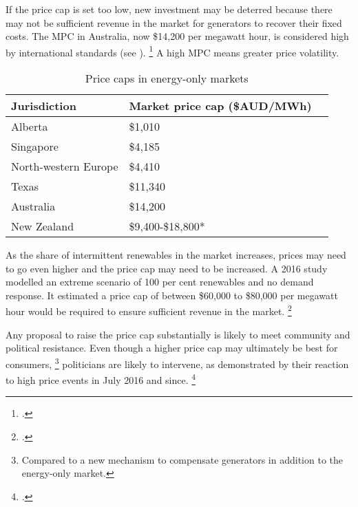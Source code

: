 \documentclass[FrontPage]{grattan}
\begin{document}
If the price cap is set too low, new investment may be deterred because there may not be sufficient revenue in the market for generators to recover their fixed costs. The MPC in Australia, now \$14,200 per megawatt hour, is considered high by international standards (see ).%
\footcite{CIGRE2016CapacityMechanisms}
A high MPC means greater price volatility.

\begin{table}
\caption{Price caps in energy-only markets}\label{tbl:price-caps-in-energy-only-markets}
\begin{tabularx}{\linewidth}{XXR}
%
\toprule
\textbf{Jurisdiction}                           & \textbf{Market price cap (\$AUD/MWh)} \\
\midrule
Alberta & \$1,010\\
Singapore & \$4,185\\
North-western Europe & \$4,410\\
Texas & \$11,340\\
Australia & \$14,200\\
New Zealand & \$9,400-\$18,800*\\
\bottomrule
\end{tabularx}
\end{table}

As the share of intermittent renewables in the market increases, prices may need to go even higher and the price cap may need to be increased. 
A 2016 study modelled an extreme scenario of 100 per cent renewables and no demand response. It estimated a price cap of between \$60,000 to \$80,000 per megawatt hour would be required to ensure sufficient revenue in the market.%
\footcite{Riesz2016MPCwithRenewables}

Any proposal to raise the price cap substantially is likely to meet community and political resistance. Even though a higher price cap may ultimately be best for consumers,%
\footnote{Compared to a new mechanism to compensate generators in addition to the energy-only market.}
politicians are likely to intervene, as demonstrated by their reaction to high price events in July 2016 and since.%
\footcites{WoodBlowers-2017-Powering-Through}{WoodBlowers-2016-Keeping-the-lights-on-SA}
\end{document}

